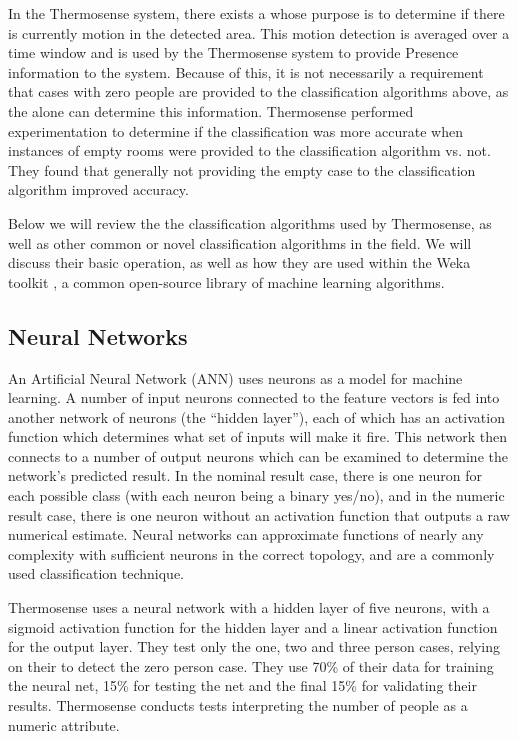 \documentclass[../thesis/thesis.tex]{subfiles}
\begin{document}
In the Thermosense system, there exists a \pir whose purpose is to determine if there is currently motion in the detected area. This motion detection is averaged over a time window and is used by the Thermosense system to provide Presence information to the system. Because of this, it is not necessarily a requirement that cases with zero people are provided to the classification algorithms above, as the \pir alone can determine this information. Thermosense performed experimentation to determine if the classification was more accurate when instances of empty rooms were provided to the classification algorithm vs. not. They found that generally not providing the empty case to the classification algorithm improved accuracy.

Below we will review the the classification algorithms used by Thermosense, as well as other common or novel classification algorithms in the field. We will discuss their basic operation, as well as how they are used within the Weka toolkit \cite{Weka}, a common open-source library of machine learning algorithms.

\subsection{Neural Networks}
An Artificial Neural Network (ANN) uses neurons as a model for machine learning. A number of input neurons connected to the feature vectors is fed into another network of neurons (the ``hidden layer''), each of which has an activation function which determines what set of inputs will make it fire. This network then connects to a number of output neurons which can be examined to determine the network's predicted result. In the nominal result case, there is one neuron for each possible class (with each neuron being a binary yes/no), and in the numeric result case, there is one neuron without an activation function that outputs a raw numerical estimate. Neural networks can approximate functions of nearly any complexity with sufficient neurons in the correct topology, and are a commonly used classification technique.

Thermosense uses a neural network with a hidden layer of five neurons, with a sigmoid activation function for the hidden layer and a linear activation function for the output layer. They test only the one, two and three person cases, relying on their \pir to detect the zero person case. They use 70\% of their data for training the neural net, 15\% for testing the net and the final 15\% for validating their results. Thermosense conducts tests interpreting the number of people as a numeric attribute.
\end{document}
